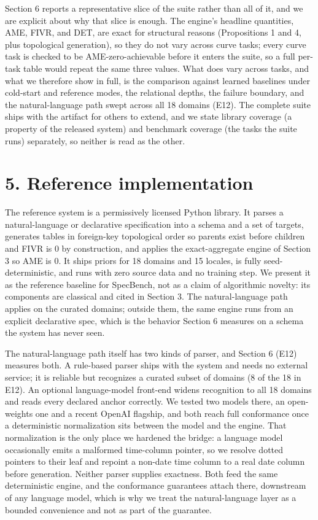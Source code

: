 Section 6 reports a representative slice of the suite rather than all of
it, and we are explicit about why that slice is enough. The engine's
headline quantities, AME, FIVR, and DET, are exact for structural
reasons (Propositions 1 and 4, plus topological generation), so they do
not vary across curve tasks; every curve task is checked to be
AME-zero-achievable before it enters the suite, so a full per-task table
would repeat the same three values. What does vary across tasks, and
what we therefore show in full, is the comparison against learned
baselines under cold-start and reference modes, the relational depths,
the failure boundary, and the natural-language path swept across all 18
domains (E12). The complete suite ships with the artifact for others to
extend, and we state library coverage (a property of the released
system) and benchmark coverage (the tasks the suite runs) separately, so
neither is read as the other.

\hypertarget{reference-implementation}{%
\section{5. Reference implementation}\label{reference-implementation}}

The reference system is a permissively licensed Python library. It
parses a natural-language or declarative specification into a schema and
a set of targets, generates tables in foreign-key topological order so
parents exist before children and FIVR is 0 by construction, and applies
the exact-aggregate engine of Section 3 so AME is 0. It ships priors for
18 domains and 15 locales, is fully seed-deterministic, and runs with
zero source data and no training step. We present it as the reference
baseline for SpecBench, not as a claim of algorithmic novelty: its
components are classical and cited in Section 3. The natural-language
path applies on the curated domains; outside them, the same engine runs
from an explicit declarative spec, which is the behavior Section 6
measures on a schema the system has never seen.

The natural-language path itself has two kinds of parser, and Section 6
(E12) measures both. A rule-based parser ships with the system and needs
no external service; it is reliable but recognizes a curated subset of
domains (8 of the 18 in E12). An optional language-model front-end
widens recognition to all 18 domains and reads every declared anchor
correctly. We tested two models there, an open-weights one and a recent
OpenAI flagship, and both reach full conformance once a deterministic
normalization sits between the model and the engine. That normalization
is the only place we hardened the bridge: a language model occasionally
emits a malformed time-column pointer, so we resolve dotted pointers to
their leaf and repoint a non-date time column to a real date column
before generation. Neither parser supplies exactness. Both feed the same
deterministic engine, and the conformance guarantees attach there,
downstream of any language model, which is why we treat the
natural-language layer as a bounded convenience and not as part of the
guarantee.


